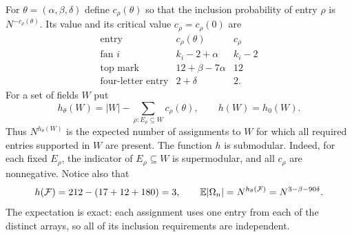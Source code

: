 For $\theta=(\alpha,\beta,\delta)$ define $c_\rho(\theta)$ so that
the inclusion probability of entry $\rho$ is $N^{-c_\rho(\theta)}$.
Its value and its critical value $c_\rho=c_\rho(0)$ are
\begin{equation}\label{sample:eq-costs}
\begin{array}{c|c|c}
\text{entry}&c_\rho(\theta)&c_\rho\\ \hline
\text{fan }i&k_i-2+\alpha&k_i-2\\
\text{top mark}&12+\beta-7\alpha&12\\
\text{four-letter entry}&2+\delta&2.
\end{array}
\end{equation}
For a set of fields $W$ put
\begin{equation}\label{sample:eq-h}
h_\theta(W)=|W|-\sum_{\rho:E_\rho\subseteq W}c_\rho(\theta),
\qquad h(W)=h_0(W).
\end{equation}
Thus $N^{h_\theta(W)}$ is the expected number of assignments to $W$
for which all required entries supported in $W$ are present.
The function $h$ is submodular.  Indeed, for each fixed $E_\rho$,
the indicator of $E_\rho\subseteq W$ is supermodular, and all
$c_\rho$ are nonnegative.  Notice also that
\begin{equation}\label{sample:eq-master-mean}
h(\mathcal F)=212-(17+12+180)=3,
\qquad
\mathbb E|\Omega_n|=N^{h_\theta(\mathcal F)}
             =N^{3-\beta-90\delta}.
\end{equation}
The expectation is exact: each assignment uses one entry from each of
the distinct arrays, so all of its inclusion requirements are independent.

